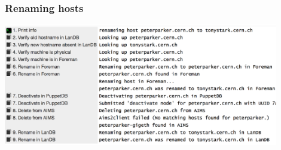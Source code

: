 \documentclass[aspectratio=169]{beamer}
\begin{document}

\begin{frame}
    \frametitle{Renaming hosts}
    \begin{center}
        \includegraphics[width=0.9\textwidth]{RunDeck_rename.png}
    \end{center}
\end{frame}

\end{document}
